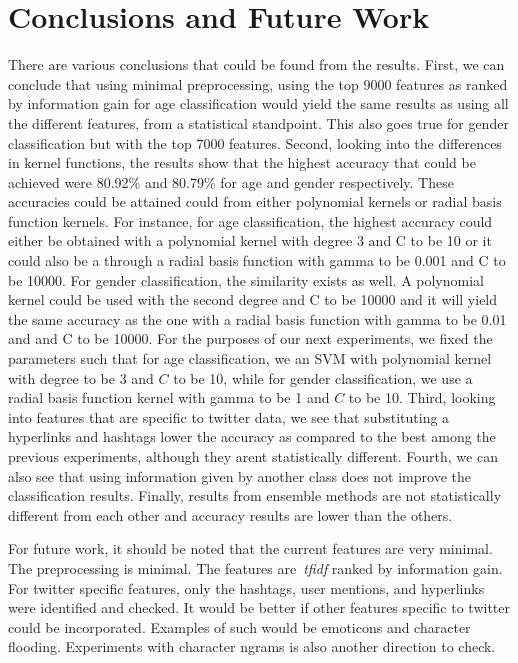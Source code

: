 \documentclass[a4paper]{llncs}
\begin{document}
\section{Conclusions and Future Work}
There are various conclusions that could be found from the results. First, we can conclude that using minimal preprocessing, using the top 9000 features as ranked by information gain for age classification would yield the same results as using all the different features, from a statistical standpoint. This also goes true for gender classification but with the top 7000 features. Second, looking into the differences in kernel functions, the results show that the highest accuracy that could be achieved were 80.92\% and 80.79\% for age and gender respectively. These accuracies could be attained could from either polynomial kernels or radial basis function kernels. For instance, for age classification, the highest accuracy could either be obtained with a polynomial kernel with degree 3 and C to be 10 or it could also be a through a radial basis function with gamma to be 0.001 and C to be 10000. For gender classification, the similarity exists as well. A polynomial kernel could be used with the second degree and C to be 10000 and it will yield the same accuracy as the one with a radial basis function with gamma to be 0.01 and and C to be 10000. For the purposes of our next experiments, we fixed the parameters such that for age classification, we an SVM with polynomial kernel with degree to be 3 and $C$ to be 10, while for gender classification, we use a radial basis function kernel with gamma to be 1 and $C$ to be 10. Third, looking into features that are specific to twitter data, we see that substituting a hyperlinks and hashtags lower the accuracy as compared to the best among the previous experiments, although they arent statistically different. Fourth, we can also see that using information given by another class does not improve the classification results. Finally, results from ensemble methods are not statistically different from each other and accuracy results are lower than the others. 

For future work, it should be noted that the current features are very minimal. The preprocessing is minimal. The features are~\textit{tfidf} ranked by information gain. For twitter specific features, only the hashtags, user mentions, and hyperlinks were identified and checked. It would be better if other features specific to twitter could be incorporated. Examples of such would be emoticons and character flooding. Experiments with character ngrams is also another direction to check. 


%





\end{document}
